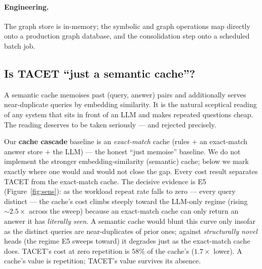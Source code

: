 \documentclass[11pt]{article}
\theoremstyle{plain}
\begin{document}
\paragraph{Engineering.} The graph store is in-memory; the symbolic and
graph operations map directly onto a production graph database, and the
consolidation step onto a scheduled batch job.

\subsection{Is TACET ``just a semantic cache''?}
\label{sec:semcache}

A semantic cache memoises past (query, answer) pairs and additionally
serves near-duplicate queries by embedding similarity. It is the natural
sceptical reading of any system that sits in front of an LLM and makes
repeated questions cheap. The reading deserves to be taken seriously ---
and rejected precisely.

Our \textbf{cache cascade} baseline is an \emph{exact-match} cache (rules
$+$ an exact-match answer store $+$ the LLM) --- the honest ``just
memoise'' baseline. We do not implement the stronger embedding-similarity
(semantic) cache; below we mark exactly where one would and would not
close the gap. Every cost result separates TACET
from the exact-match cache. The decisive evidence is E5 (Figure~\ref{fig:sens}): as the
workload repeat rate falls to zero --- every query distinct --- the
cache's cost climbs steeply toward the LLM-only regime (rising
${\sim}2.5\times$ across the sweep) because an exact-match cache can only
return an answer it has \emph{literally seen}. A semantic cache would blunt
this curve only insofar as the distinct queries are near-duplicates of
prior ones; against \emph{structurally novel} heads (the regime E5 sweeps
toward) it degrades just as the exact-match cache does. TACET's cost at
zero repetition is $58\%$ of the cache's ($1.7\times$ lower). A cache's value is
repetition; TACET's value survives its absence.
\end{document}
